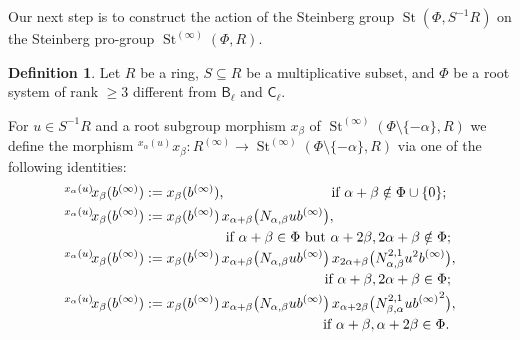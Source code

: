 \documentclass[oneside, 11pt]{amsart}
\numberwithin{equation}{section}
\theoremstyle{definition}
\newtheorem{df}[lemma]{Definition} \Crefname{df}{Definition}{Definitions}
\theoremstyle{remark}
\DeclareMathOperator\St{St}
\newcommand{\up}[2]{{^{#1}\!{#2}}}
\newcommand{\rB}{\mathsf{B}}
\newcommand{\rC}{\mathsf{C}}
\begin{document}
Our next step is to construct the action of the Steinberg group $\St(\Phi, S^{-1}R)$ on the Steinberg pro-group $\St^{(\infty)}(\Phi, R)$.
\begin{df}\label{root-action}
 Let \(R\) be a ring, \(S \subseteq R\) be a multiplicative subset, and \(\Phi\) be a root system of rank \(\geq 3\) different from \(\rB_\ell\) and \(\rC_\ell\).
 
 For $u \in S^{-1}R$ and a root subgroup morphism $x_\beta$ of $\St^{(\infty)}(\Phi\setminus\{-\alpha\}, R)$ we define the morphism 
 $\up{x_\alpha(u)}x_\beta \colon R^{(\infty)} \to \St^{(\infty)}(\Phi\setminus\{-\alpha\}, R)$
 via one of the following identities:
 \begin{align} 
 \multispan2{$\up{x_\alpha(u)}{x_\beta(b^{(\infty)})} := x_\beta(b^{(\infty)}),$ \hfill if $\alpha + \beta \notin \Phi \cup \{0\}$;} \label{eq:action-R2} \\
 \up{x_\alpha(u)}{x_\beta(b^{(\infty)})}
 &:= x_\beta(b^{(\infty)})\,
 x_{\alpha + \beta}\bigl(N_{\alpha, \beta} u b^{(\infty)}\bigr), \label{eq:action-R3} \\
 \multispan2{\hfill if $\alpha + \beta \in \Phi$ but $\alpha + 2\beta, 2\alpha + \beta \notin \Phi$;} \nonumber \\
 \up{x_\alpha(u)}{x_\beta(b^{(\infty)})}
 &:= x_\beta(b^{(\infty)})\,
  x_{\alpha + \beta}\bigl(N_{\alpha, \beta} u b^{(\infty)}\bigr)\,
  x_{2\alpha + \beta}\bigl(N^{2,1}_{\alpha, \beta} u^2 b^{(\infty)}\bigr), \label{eq:action-R4a} \\
 \multispan2{\hfill if $\alpha + \beta, 2\alpha + \beta \in \Phi$;} \nonumber \\
 \up{x_\alpha(u)}{x_\beta(b^{(\infty)})}
 &:= x_\beta(b^{(\infty)})\,
  x_{\alpha + \beta}\bigl(N_{\alpha, \beta} u b^{(\infty)}\bigr)\,
  x_{\alpha + 2\beta}\bigl(N^{2,1}_{\beta, \alpha} u {b^{(\infty)}}^2\bigr), \label{eq:action-R4b} \\
 \multispan2{\hfill if $\alpha + \beta, \alpha + 2\beta \in \Phi$.} \nonumber
 \end{align} 
\end{df}
\end{document}

